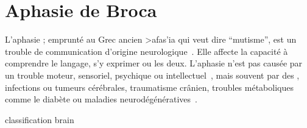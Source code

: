 \chapter{Aphasie de Broca}

L'aphasie ; emprunté au Grec ancien \textgreek{>afas'ia} qui veut dire ``mutisme'',
est un trouble de communication d'origine neurologique~\cite{Larousse}. 
Elle affecte la capacité à comprendre le langage, s'y exprimer ou les deux.
L'aphasie n'est pas causée par un trouble moteur, sensoriel, psychique ou intellectuel~\cite{Chapey_2008},
mais souvent par des , infections ou tumeurs cérébrales, traumatisme crânien, 
troubles métaboliques comme le diabète ou maladies neurodégénératives~\cite{Hallowell_2017}.


{classification}
{brain}
